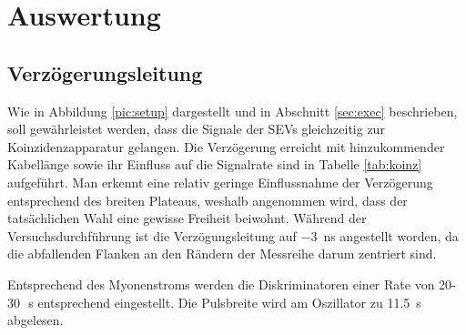 \section{Auswertung}
\subsection{Verzögerungsleitung}
Wie in Abbildung \ref{pic:setup} dargestellt und in Abschnitt \ref{sec:exec} beschrieben, soll gewährleistet werden, dass die Signale der SEVs 
gleichzeitig zur Koinzidenzapparatur gelangen. Die Verzögerung erreicht mit hinzukommender Kabellänge sowie ihr Einfluss auf die Signalrate
sind in Tabelle \ref{tab:koinz} aufgeführt. Man erkennt eine relativ geringe Einflussnahme der Verzögerung entsprechend des breiten Plateaus,
weshalb angenommen wird, dass der tatsächlichen Wahl eine gewisse Freiheit beiwohnt. 
Während der Versuchsdurchführung ist die Verzögungsleitung auf \SI{-3}{\nano\second} angestellt worden, da die abfallenden Flanken an den 
Rändern der Messreihe darum zentriert sind. 
\begin{table}[b]

\caption{Verzögerungsleitung zur Synchronisierung der SEVs. Negative $t$ entsprechen einer Verzögerung des linken SEVs. In der dritten Spalte 
sind die Zählraten auf 10\,s Messzeit aufgeführt.}
\label{tab:koinz}
\end{table}
Entsprechend des Myonenstroms \cite{pdg} werden die Diskriminatoren einer Rate von 20-30\,\si{\per\second} \cite{Anl} entsprechend eingestellt. Die 
Pulsbreite wird am Oszillator zu \SI{11,5}{\s} abgelesen.
